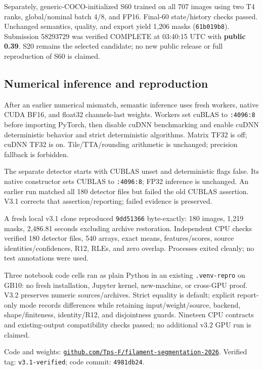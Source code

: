 \documentclass[sigconf]{acmart}
\newcommand{\code}[1]{\texttt{\small #1}}
\begin{document}
Separately, generic-COCO-initialized S60 trained on all 707 images using two T4 ranks, global/nominal batch 4/8, and FP16. Final-60 state/history checks passed. Unchanged semantics, quality, and export yield 1,206 masks (\code{61b019b8}). Submission 58293729 was verified COMPLETE at 03:40:15 UTC with \textbf{public 0.39}. S20 remains the selected candidate; no new public release or full reproduction of S60 is claimed.

\subsection{Numerical inference and reproduction}
After an earlier numerical mismatch, semantic inference uses fresh workers, native CUDA BF16, and float32 channels-last weights. Workers set cuBLAS to \code{:4096:8} before importing PyTorch, then disable cuDNN benchmarking and enable cuDNN deterministic behavior and strict deterministic algorithms. Matrix TF32 is off; cuDNN TF32 is on. Tile/TTA/rounding arithmetic is unchanged; precision fallback is forbidden.

The separate detector starts with CUBLAS unset and deterministic flags false. Its native constructor sets CUBLAS to \code{:4096:8}; FP32 inference is unchanged. An earlier run matched all 180 detector files but failed the old CUBLAS assertion. V3.1 corrects that assertion/reporting; failed evidence is preserved.

A fresh local v3.1 clone reproduced \code{9dd51366} byte-exactly: 180 images, 1,219 masks, 2,486.81 seconds excluding archive restoration. Independent CPU checks verified 180 detector files, 540 arrays, exact means, features/scores, source identities/confidences, R12, RLEs, and zero overlap. Processes exited cleanly; no test annotations were used.

Three notebook code cells ran as plain Python in an existing \code{.venv-repro} on GB10: no fresh installation, Jupyter kernel, new-machine, or cross-GPU proof. V3.2 preserves numeric sources/archives. Strict equality is default; explicit report-only mode records differences while retaining input/weight/source, backend, shape/finiteness, identity/R12, and disjointness guards. Nineteen CPU contracts and existing-output compatibility checks passed; no additional v3.2 GPU run is claimed.

Code and weights: \href{https://github.com/Tps-F/filament-segmentation-2026}{\nolinkurl{github.com/Tps-F/filament-segmentation-2026}}. Verified tag: \code{v3.1-verified}; code commit: \code{4981db24}.
\end{document}
